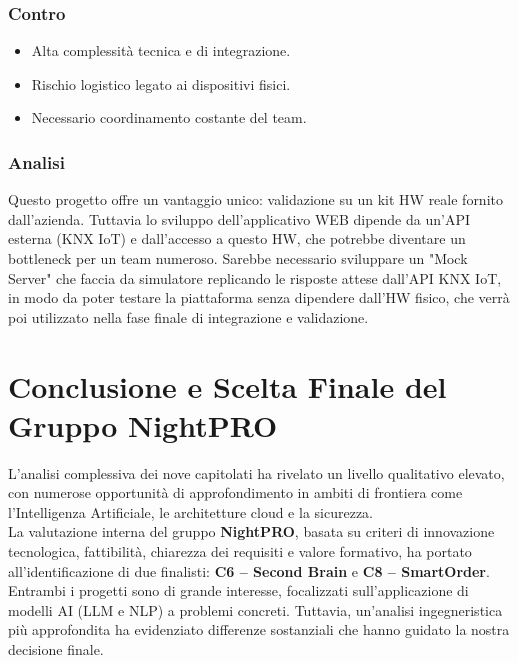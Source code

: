 \documentclass[a4paper, 11pt, oneside]{scrartcl} %
\begin{document}
\subsubsection*{Contro}
\begin{itemize}
    \item Alta complessità tecnica e di integrazione.
    \item Rischio logistico legato ai dispositivi fisici.
    \item Necessario coordinamento costante del team.
\end{itemize}
\subsubsection*{Analisi}
Questo progetto offre un vantaggio unico: validazione su un kit HW reale fornito dall'azienda. Tuttavia lo sviluppo dell'applicativo WEB dipende da un'API esterna (KNX IoT) e dall'accesso a questo HW, che potrebbe diventare un bottleneck per un team numeroso. Sarebbe necessario sviluppare un "Mock Server" che faccia da simulatore replicando le risposte attese dall'API KNX IoT, in modo da poter testare la piattaforma senza dipendere dall'HW fisico, che verrà poi utilizzato nella fase finale di integrazione e validazione.


\section{Conclusione e Scelta Finale del Gruppo NightPRO}

L'analisi complessiva dei nove capitolati ha rivelato un livello qualitativo elevato, con numerose opportunità di approfondimento in ambiti di frontiera come l'Intelligenza Artificiale, le architetture cloud e la sicurezza.
\\[0.6em]
La valutazione interna del gruppo \textbf{NightPRO}, basata su criteri di innovazione tecnologica, fattibilità, chiarezza dei requisiti e valore formativo, ha portato all'identificazione di due finalisti: \textbf{C6 – Second Brain} e \textbf{C8 – SmartOrder}.
\\[0.6em]
Entrambi i progetti sono di grande interesse, focalizzati sull'applicazione di modelli AI (LLM e NLP) a problemi concreti. Tuttavia, un'analisi ingegneristica più approfondita ha evidenziato differenze sostanziali che hanno guidato la nostra decisione finale.
\end{document}

